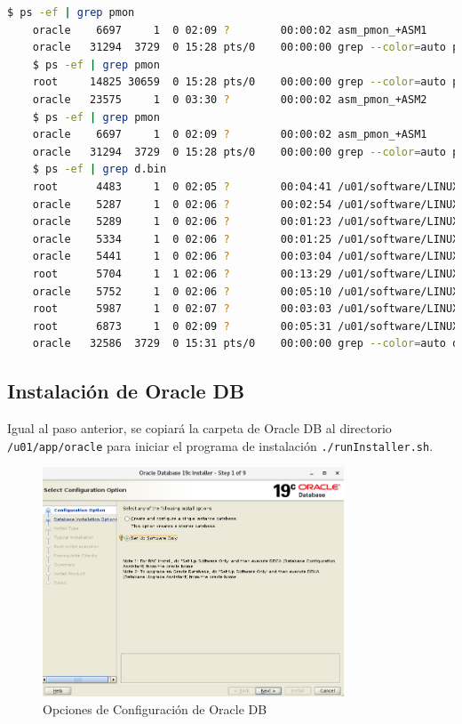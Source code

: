 \documentclass{article}
\begin{document}
\begin{lstlisting}[style=mystyle,language=bash]
	$ ps -ef | grep pmon
	oracle    6697     1  0 02:09 ?        00:00:02 asm_pmon_+ASM1
	oracle   31294  3729  0 15:28 pts/0    00:00:00 grep --color=auto pmon
	$ ps -ef | grep pmon
	root     14825 30659  0 15:28 pts/0    00:00:00 grep --color=auto pmon
	oracle   23575     1  0 03:30 ?        00:00:02 asm_pmon_+ASM2
	$ ps -ef | grep pmon
	oracle    6697     1  0 02:09 ?        00:00:02 asm_pmon_+ASM1
	oracle   31294  3729  0 15:28 pts/0    00:00:00 grep --color=auto pmon
	$ ps -ef | grep d.bin
	root      4483     1  0 02:05 ?        00:04:41 /u01/software/LINUX.X64_193000_grid_home/bin/ohasd.bin reboot BLOCKING_STACK_LOCALE_OHAS=AMERICAN_AMERICA.AL32UTF8
	oracle    5287     1  0 02:06 ?        00:02:54 /u01/software/LINUX.X64_193000_grid_home/bin/evmd.bin
	oracle    5289     1  0 02:06 ?        00:01:23 /u01/software/LINUX.X64_193000_grid_home/bin/mdnsd.bin
	oracle    5334     1  0 02:06 ?        00:01:25 /u01/software/LINUX.X64_193000_grid_home/bin/gpnpd.bin
	oracle    5441     1  0 02:06 ?        00:03:04 /u01/software/LINUX.X64_193000_grid_home/bin/gipcd.bin
	root      5704     1  1 02:06 ?        00:13:29 /u01/software/LINUX.X64_193000_grid_home/bin/osysmond.bin
	oracle    5752     1  0 02:06 ?        00:05:10 /u01/software/LINUX.X64_193000_grid_home/bin/ocssd.bin  -S 1
	root      5987     1  0 02:07 ?        00:03:03 /u01/software/LINUX.X64_193000_grid_home/bin/octssd.bin reboot
	root      6873     1  0 02:09 ?        00:05:31 /u01/software/LINUX.X64_193000_grid_home/bin/crsd.bin reboot
	oracle   32586  3729  0 15:31 pts/0    00:00:00 grep --color=auto d.bin
\end{lstlisting}

\subsection{Instalación de Oracle DB}

Igual al paso anterior, se copiará la carpeta de Oracle DB al directorio \texttt{/u01/app/oracle} para iniciar el programa de instalación \texttt{./runInstaller.sh}.

\begin{figure}[H]
		\begin{center}
			\includegraphics[width=0.80\textwidth]{db_install_1_configuration_options}
		\end{center}
		\caption{Opciones de Configuración de Oracle DB}
\end{figure}
\end{document}
